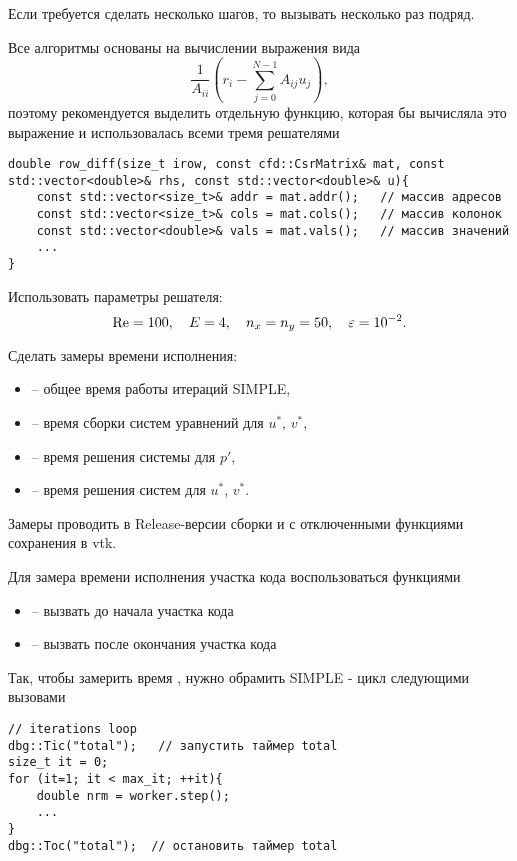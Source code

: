 Если требуется сделать несколько шагов, то вызывать несколько раз подряд.


Все алгоритмы основаны на вычислении выражения вида
\begin{equation*}
   \frac{1}{A_{ii}}\left(r_i - \sum_{j=0}^{N-1} A_{ij}{u_j}\right),
\end{equation*}
поэтому рекомендуется выделить отдельную функцию, которая бы вычисляла это выражение
и использовалась всеми тремя решателями
\begin{verbatim}
double row_diff(size_t irow, const cfd::CsrMatrix& mat, const std::vector<double>& rhs, const std::vector<double>& u){
	const std::vector<size_t>& addr = mat.addr();   // массив адресов
	const std::vector<size_t>& cols = mat.cols();   // массив колонок
	const std::vector<double>& vals = mat.vals();   // массив значений
    ...
}
\end{verbatim}

Использовать параметры решателя:
\begin{equation*}
    \mathrm{Re} = 100, \quad E = 4, \quad n_x = n_y = 50, \quad \varepsilon = 10^{-2}.
\end{equation*}

Сделать замеры времени исполнения:
\begin{itemize}
\item {} -- общее время работы итераций SIMPLE,
\item {} -- время сборки систем уравнений для $u^*$, $v^*$,
\item {} -- время решения системы для $p'$,
\item {} -- время решения систем для $u^*$, $v^*$.
\end{itemize}

Замеры проводить в Release-версии сборки и с отключенными функциями сохранения в vtk.

Для замера времени исполнения участка кода воспользоваться функциями
\begin{itemize}
\item {} -- вызвать до начала участка кода
\item {} -- вызвать после окончания участка кода
\end{itemize}

Так, чтобы замерить время , нужно обрамить SIMPLE - цикл следующими вызовами
\begin{verbatim}
// iterations loop
dbg::Tic("total");   // запустить таймер total
size_t it = 0;
for (it=1; it < max_it; ++it){
    double nrm = worker.step();
    ...
}
dbg::Toc("total");  // остановить таймер total
\end{verbatim}

